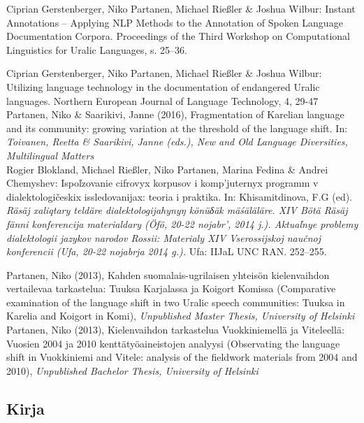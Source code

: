 \documentclass[11pt, a4paper]{article}
\newcommand{\years}[1]{\marginnote{\scriptsize #1}} %
\begin{document}
\years{2017} Ciprian Gerstenberger, Niko Partanen, Michael Rießler \& Joshua Wilbur: Instant Annotations -- Applying NLP Methods to the Annotation of Spoken Language Documentation Corpora. Proceedings of the Third Workshop on Computational Linguistics for Uralic Languages, s. 25--36.

\years{2016} Ciprian Gerstenberger, Niko Partanen, Michael Rießler \& Joshua Wilbur: Utilizing language technology in the documentation of endangered Uralic languages. Northern European Journal of Language Technology, 4, 29-47 \\

\years{2016} Partanen, Niko \& Saarikivi, Janne (2016), Fragmentation of Karelian language and its community: growing variation at the threshold of the language shift. In: \emph{Toivanen, Reetta \& Saarikivi, Janne (eds.), New and Old Language Diversities, Multilingual Matters}\\

\years{2014} Rogier Blokland, Michael Rießler, Niko Partanen, Marina Fedina \& Andrei Chemyshev: Ispoľzovanie cifrovyx korpusov i komp’juternyx programm v dialektologičeskix issledovanijax: teoria i praktika. In: Khisamitdinova, F.G (ed). \emph{Räsäj xaliqtary teldäre dialektologijahynyŋ könüδäk mäśäläläre. XIV Bötä Räsäj fänni konferencija materialdary (Öfö, 20-22 nojabr’, 2014 j.). Aktuaľnye problemy dialektologii jazykov narodov Rossii: Materialy XIV Vserossijskoj naučnoj konferencii (Ufa, 20-22 nojabrja 2014 g.).} Ufa: IIJaL UNC RAN. 252–255.

\years{2013}Partanen, Niko (2013), Kahden suomalais-ugrilaisen yhteisön kielenvaihdon vertailevaa tarkastelua: Tuuksa Karjalassa ja Koigort Komissa (Comparative examination of the language shift in two Uralic speech communities: Tuuksa in Karelia and Koigort in Komi), \emph{Unpublished Master Thesis, University of Helsinki}\\

\years{2013}Partanen, Niko (2013), Kielenvaihdon tarkastelua Vuokkiniemellä ja Viteleellä: Vuosien 2004 ja 2010 kenttätyöaineistojen analyysi (Observating the language shift in Vuokkiniemi and Vitele: analysis of the fieldwork materials from 2004 and 2010), \emph{Unpublished Bachelor Thesis, University of Helsinki}\\



\subsection*{Kirja}
\end{document}
